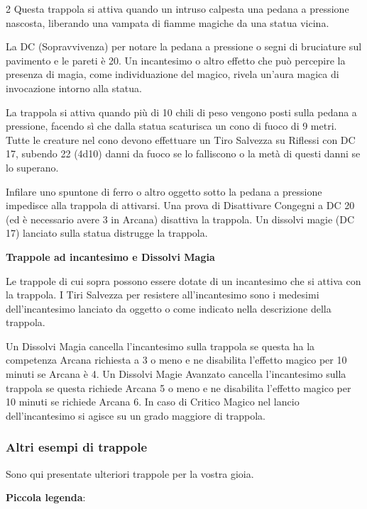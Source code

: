 \begin{multicols}{2}
Questa trappola si attiva quando un intruso calpesta una pedana a pressione nascosta, liberando una vampata di fiamme magiche da una statua vicina.

La DC (Sopravvivenza) per notare la pedana a pressione o segni di bruciature sul pavimento e le pareti è 20. Un incantesimo o altro effetto che può percepire la presenza di magia, come individuazione del magico, rivela un'aura magica di invocazione intorno alla statua.

La trappola si attiva quando più di 10 chili di peso vengono posti sulla pedana a pressione, facendo sì che dalla statua scaturisca un cono di fuoco di 9 metri. Tutte le creature nel cono devono effettuare un Tiro Salvezza su Riflessi con DC 17, subendo 22 (4d10) danni da fuoco se lo falliscono o la metà di questi danni se lo superano.

Infilare uno spuntone di ferro o altro oggetto sotto la pedana a pressione impedisce alla trappola di attivarsi. Una prova di Disattivare Congegni a DC 20 (ed è necessario avere 3 in Arcana) disattiva la trappola. Un dissolvi magie (DC 17) lanciato sulla statua distrugge la trappola.

\medskip

\textbf{Trappole ad incantesimo e Dissolvi Magia}

Le trappole di cui sopra possono essere dotate di un incantesimo che si attiva con la trappola.
I Tiri Salvezza per resistere all'incantesimo sono i medesimi dell'incantesimo lanciato da oggetto o come indicato nella descrizione della trappola.

Un Dissolvi Magia cancella l'incantesimo sulla trappola se questa ha la competenza Arcana richiesta a 3 o meno e ne disabilita l'effetto magico per 10 minuti se Arcana è 4.
Un Dissolvi Magie Avanzato cancella l'incantesimo sulla trappola se questa richiede Arcana 5 o meno e ne disabilita l'effetto magico per 10 minuti se richiede Arcana 6. In caso di Critico Magico nel lancio dell'incantesimo si agisce su un grado maggiore di trappola.

\subsubsection{Altri esempi di trappole}

Sono qui presentate ulteriori trappole per la vostra gioia.

\medskip

\textbf{Piccola legenda}:


\end{multicols}
